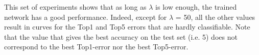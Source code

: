 \documentclass{article}
\begin{document}
This set of experiments shows that as long as $\lambda$ is low enough, the trained network has a good performance. Indeed, except for $\lambda$ = 50, all the other values result in curves for the Top1 and Top5 errors that are
hardly classifiable. Note that the value that gives the best accuracy on the test set (i.e. 5) does not correspond to the best Top1-error nor the best Top5-error.


\end{document}
